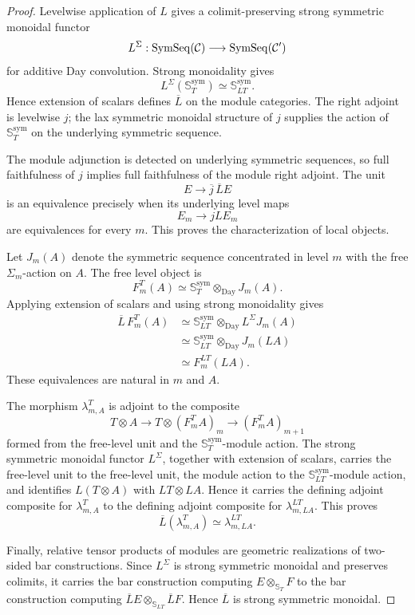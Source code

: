 \begin{proof}
Levelwise application of $L$ gives a colimit-preserving strong symmetric
monoidal functor
\[
    L^{\Sigma}:\operatorname{SymSeq}(\mathcal C)\longrightarrow\operatorname{SymSeq}(\mathcal C')
\]
for additive Day convolution.  Strong monoidality gives
\[
    L^{\Sigma}(\mathbb S_T^{\mathrm{sym}})
    \simeq
    \mathbb S_{LT}^{\mathrm{sym}}.
\]
Hence extension of scalars defines $\overline L$ on the module categories.
The right adjoint is levelwise $j$; the lax symmetric monoidal structure of
$j$ supplies the action of $\mathbb S_T^{\mathrm{sym}}$ on the underlying
symmetric sequence.

The module adjunction is detected on underlying symmetric sequences, so full
faithfulness of $j$ implies full faithfulness of the module right adjoint.
The unit
\[
    E\longrightarrow\overline j\,\overline L E
\]
is an equivalence precisely when its underlying level maps
\[
    E_m\longrightarrow jLE_m
\]
are equivalences for every $m$.  This proves the characterization of local
objects.

Let $J_m(A)$ denote the symmetric sequence concentrated in level $m$ with the
free $\Sigma_m$-action on $A$.  The free level object is
\[
    F_m^T(A)
    \simeq
    \mathbb S_T^{\mathrm{sym}}
    \otimes_{\mathrm{Day}}
    J_m(A).
\]
Applying extension of scalars and using strong monoidality gives
\[
\begin{aligned}
    \overline L\,F_m^T(A)
    &\simeq
    \mathbb S_{LT}^{\mathrm{sym}}
    \otimes_{\mathrm{Day}}
    L^\Sigma J_m(A)\\
    &\simeq
    \mathbb S_{LT}^{\mathrm{sym}}
    \otimes_{\mathrm{Day}}
    J_m(LA)\\
    &\simeq
    F_m^{LT}(LA).
\end{aligned}
\]
These equivalences are natural in $m$ and $A$.

The morphism $\lambda^T_{m,A}$ is adjoint to the composite
\[
    T\otimes A
    \longrightarrow
    T\otimes(F_m^T A)_m
    \longrightarrow
    (F_m^T A)_{m+1}
\]
formed from the free-level unit and the
$\mathbb S_T^{\mathrm{sym}}$-module action.  The strong symmetric monoidal
functor $L^\Sigma$, together with extension of scalars, carries the free-level
unit to the free-level unit, the module action to the
$\mathbb S_{LT}^{\mathrm{sym}}$-module action, and identifies
$L(T\otimes A)$ with $LT\otimes LA$.  Hence it carries the defining adjoint
composite for $\lambda^T_{m,A}$ to the defining adjoint composite for
$\lambda^{LT}_{m,LA}$.  This proves
\[
    \overline L(\lambda^T_{m,A})
    \simeq
    \lambda^{LT}_{m,LA}.
\]

Finally, relative tensor products of modules are geometric realizations of
two-sided bar constructions.  Since $L^{\Sigma}$ is strong symmetric
monoidal and preserves colimits, it carries the bar construction computing
$E\otimes_{\mathbb S_T}F$ to the bar construction computing
$\overline LE\otimes_{\mathbb S_{LT}}\overline LF$.  Hence $\overline L$ is
strong symmetric monoidal.
\end{proof}

